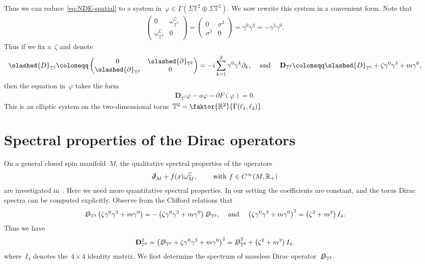 \documentclass[11pt,final]{amsart}
\newcommand{\p}{\partial}
\newcommand{\R}{\mathbb{R}}
\newcommand{\C}{\mathbb{C}}
\newcommand{\T}{\mathbb{T}}
\newcommand{\D}{\slashed{D}}
\newcommand{\pd}{\slashed{\partial}}
\newcommand{\pD}{\mathbf{D}}
\newcommand{\parenthesis}[1]{\left(#1\right)} %
\begin{document}
Thus we can reduce~\eqref{eq:NDE-spatial} to a system in~$\varphi\in\Gamma(\Sigma\T^2\oplus \Sigma\T^2)$. 
We now rewrite this system in a convenient form. 
Note that 
\begin{align}
    \begin{pmatrix} 0 & \omega_{\T^2}^{\C} \\ \omega_{\T^2}^{\C} & 0 \end{pmatrix} 
    =
    \begin{pmatrix} 0 & \sigma^3 \\ \sigma^3 & 0 \end{pmatrix}
    = \gamma^0 \gamma^3  = -\gamma^3\gamma^0.
\end{align}
Thus if we fix a~$\zeta$ and denote
\begin{align}\label{eq:Dirac-operators}
    \D_{\T^2}
    \coloneqq \begin{pmatrix}  0 & \pd_{\T^2} \\ \pd_{\T^2} & 0 \end{pmatrix}= -i\sum_{k=1}^2 \gamma^0\gamma^k\p_k, 
    & & \mbox{ and } & & 
    \pD_{\T^2} \coloneqq \D_{\T^2}+\zeta\gamma^0\gamma^3+m\gamma^0, 
\end{align}
then the equation in~$\varphi$ takes the form
\begin{align}\label{eq:NDE-T2}
    \pD_{\T^2}\varphi- a\varphi -\p F(\varphi)=0. 
\end{align}
This is an elliptic system on the two-dimensional torus~$\T^2= \faktor{\R^2}{\Gamma(\ell_1,\ell_2)}$. 


\section{Spectral properties of the Dirac operators}\label{sect:spectral}

On a general closed spin manifold~$M$, the qualitative spectral properties of the operators 
\begin{align}
    \pd_M + f(x)\omega^{\C}_M, \qquad \mbox{ with } f\in C^\infty(M, \R_+)
\end{align}
are investigated in~\cite{SireXu2023variational}. 
Here we need more quantitative spectral properties. 
In our setting the coefficients are constant, and the torus Dirac spectra can be computed explicitly. 
Observe from the Clifford relations that
    \begin{align}
        \D_{\T^2}\parenthesis{\zeta\gamma^0\gamma^3+m\gamma^0}
        = -\parenthesis{\zeta\gamma^0\gamma^3+m\gamma^0} \D_{\T^2}, 
        & & 
        \mbox{ and } 
        & & 
        \parenthesis{\zeta\gamma^0\gamma^3+m\gamma^0}^2
        =\parenthesis{\zeta^2+m^2}I_4.
    \end{align}
Thus we have
\begin{align}
    \pD_{\T^2}^2
    =\parenthesis{ \D_{\T^2} + \zeta \gamma^0\gamma^3 + m\gamma^0}^2 
    =\D_{\T^2}^2 + \parenthesis{\zeta^2+m^2}I_4.
\end{align}
where~$I_4$ denotes the~$4\times 4$ identity matrix.
We first determine the spectrum of massless Dirac operator~$\D_{\T^2}$. 
\end{document}
